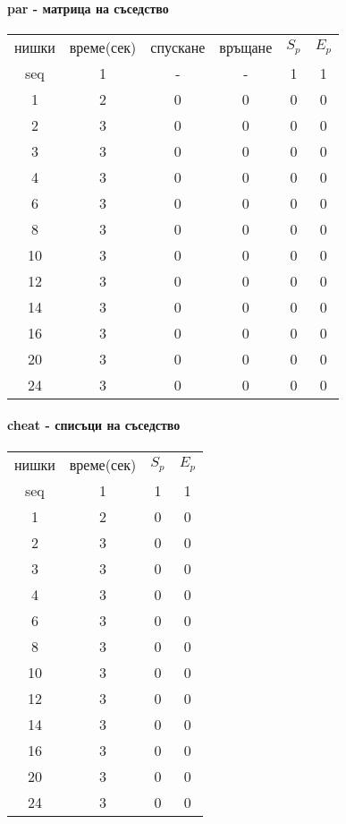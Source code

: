 \paragraph*{par - матрица на съседство}

\begin{center}
\begin{tabular}{ c c c c c c }
  нишки & време(сек) & спускане & връщане & $S_p$ & $E_p$ \\
  seq & 1 & - & - & 1 & 1 \\
  1 & 2 & 0 & 0 & 0 & 0 \\
  2 & 3 & 0 & 0 & 0 & 0 \\
  3 & 3 & 0 & 0 & 0 & 0 \\
  4 & 3 & 0 & 0 & 0 & 0 \\
  6 & 3 & 0 & 0 & 0 & 0 \\
  8 & 3 & 0 & 0 & 0 & 0 \\
  10 & 3 & 0 & 0 & 0 & 0 \\
  12 & 3 & 0 & 0 & 0 & 0 \\
  14 & 3 & 0 & 0 & 0 & 0 \\
  16 & 3 & 0 & 0 & 0 & 0 \\
  20 & 3 & 0 & 0 & 0 & 0 \\
  24 & 3 & 0 & 0 & 0 & 0 \\
\end{tabular}
\end{center}

\paragraph*{cheat - списъци на съседство}

\begin{center}
\begin{tabular}{ c c c c }
  нишки & време(сек) & $S_p$ & $E_p$ \\
  seq & 1 & 1 & 1 \\
  1 & 2 & 0 & 0 \\
  2 & 3 & 0 & 0 \\
  3 & 3 & 0 & 0 \\
  4 & 3 & 0 & 0 \\
  6 & 3 & 0 & 0 \\
  8 & 3 & 0 & 0 \\
  10 & 3 & 0 & 0 \\
  12 & 3 & 0 & 0 \\
  14 & 3 & 0 & 0 \\
  16 & 3 & 0 & 0 \\
  20 & 3 & 0 & 0 \\
  24 & 3 & 0 & 0 \\
\end{tabular}
\end{center}

